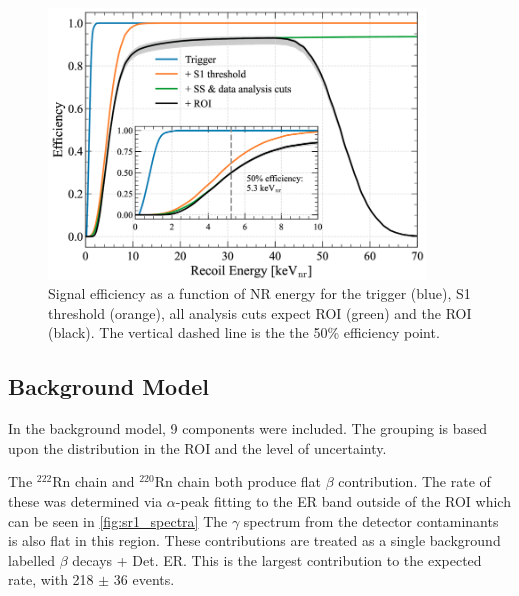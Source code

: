 \begin{figure}
    \centering
    \includegraphics[width=10cm]{Figures/EFT/All_SR1_Plots/NR_efficiency.png}
    \caption{Signal efficiency as a function of NR energy for the trigger (blue), S1 threshold (orange), all analysis cuts expect ROI (green) and the ROI (black).
    The vertical dashed line is the the 50\% efficiency point.
    }
    \label{fig:sr1_nr_efficiency}
\end{figure}

\subsection{Background Model}
\par
In the background model, 9 components were included.
The grouping is based upon the distribution in the ROI and the level of uncertainty.

\par
The ${}^{222}$Rn chain and ${}^{220}$Rn chain both produce flat $\beta$ contribution.
The rate of these was determined via $\alpha$-peak fitting to the ER band outside of the ROI which can be seen in \autoref{fig:sr1_spectra}
The $\gamma$ spectrum from the detector contaminants is also flat in this region.
These contributions are treated as a single background labelled $\beta$ decays + Det. ER.
This is the largest contribution to the expected rate, with 218 $\pm$ 36 events.

